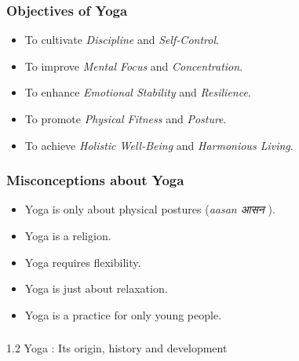 \begin{frame}[fragile]\frametitle{Objectives of Yoga}

      \begin{itemize}
		\item To cultivate \textit{Discipline} and \textit{Self-Control}.
		\item To improve \textit{Mental Focus} and \textit{Concentration}.
		\item To enhance \textit{Emotional Stability} and \textit{Resilience}.
		\item To promote \textit{Physical Fitness} and \textit{Posture}.
		\item To achieve \textit{Holistic Well-Being} and \textit{Harmonious Living}.
	  \end{itemize}

\end{frame}

\begin{frame}[fragile]\frametitle{Misconceptions about Yoga}

      \begin{itemize}
		\item Yoga is only about physical postures (\textit{aasan आसन }).
		\item Yoga is a religion.
		\item Yoga requires flexibility.
		\item Yoga is just about relaxation.
		\item Yoga is a practice for only young people.
		
	  \end{itemize}

\end{frame}


\begin{frame}[fragile]\frametitle{}
\begin{center}
{\Large 1.2 Yoga : Its origin, history and development}
\end{center}
\end{frame}


